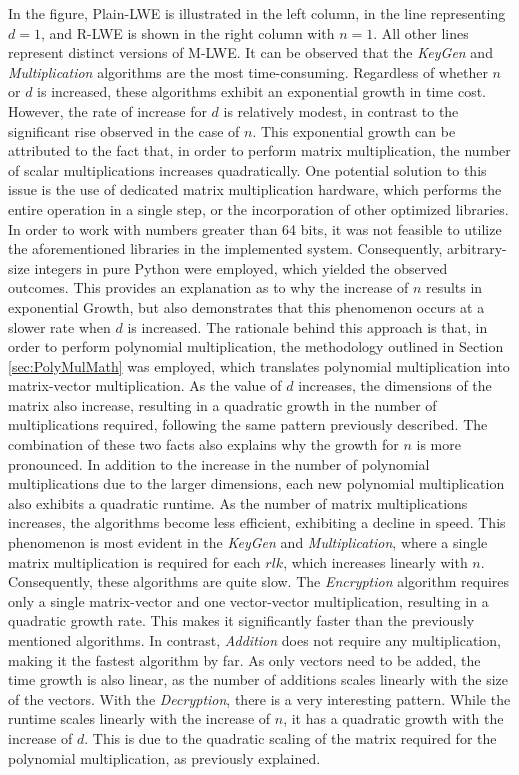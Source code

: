 In the figure, Plain-LWE is illustrated in the left column, in the line representing $d=1$, and R-LWE is shown in the right column with $n=1$. All other lines represent distinct versions of M-LWE. It can be observed that the \textit{KeyGen} and \textit{Multiplication} algorithms are the most time-consuming. Regardless of whether $n$ or $d$ is increased, these algorithms exhibit an exponential growth in time cost. However, the rate of increase for $d$ is relatively modest, in contrast to the significant rise observed in the case of $n$. This exponential growth can be attributed to the fact that, in order to perform matrix multiplication, the number of scalar multiplications increases quadratically. One potential solution to this issue is the use of dedicated matrix multiplication hardware, which performs the entire operation in a single step, or the incorporation of other optimized libraries. In order to work with numbers greater than 64 bits, it was not feasible to utilize the aforementioned libraries in the implemented system. Consequently, arbitrary-size integers in pure Python were employed, which yielded the observed outcomes. This provides an explanation as to why the increase of $n$ results in exponential Growth, but also demonstrates that this phenomenon occurs at a slower rate when $d$ is increased. The rationale behind this approach is that, in order to perform polynomial multiplication, the methodology outlined in Section \ref{sec:PolyMulMath} was employed, which translates polynomial multiplication into matrix-vector multiplication. As the value of $d$ increases, the dimensions of the matrix also increase, resulting in a quadratic growth in the number of multiplications required, following the same pattern previously described. The combination of these two facts also explains why the growth for $n$ is more pronounced. In addition to the increase in the number of polynomial multiplications due to the larger dimensions, each new polynomial multiplication also exhibits a quadratic runtime.
As the number of matrix multiplications increases, the algorithms become less efficient, exhibiting a decline in speed. This phenomenon is most evident in the \textit{KeyGen} and \textit{Multiplication}, where a single matrix multiplication is required for each $rlk$, which increases linearly with $n$. Consequently, these algorithms are quite slow. The \textit{Encryption} algorithm requires only a single matrix-vector and one vector-vector multiplication, resulting in a quadratic growth rate. This makes it significantly faster than the previously mentioned algorithms. In contrast, \textit{Addition} does not require any multiplication, making it the fastest algorithm by far. As only vectors need to be added, the time growth is also linear, as the number of additions scales linearly with the size of the vectors. With the \textit{Decryption}, there is a very interesting pattern. While the runtime scales linearly with the increase of $n$, it has a quadratic growth with the increase of $d$. This is due to the quadratic scaling of the matrix required for the polynomial multiplication, as previously explained.

